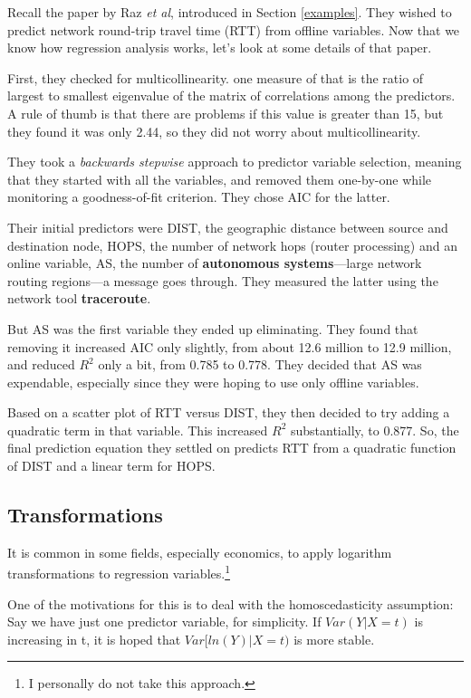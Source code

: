 Recall the paper by Raz {\it et al}, introduced in Section
\ref{examples}.  They wished to predict network round-trip travel time
(RTT) from offline variables.  Now that we know how regression analysis
works, let's look at some details of that paper.

First, they checked for multicollinearity.  one measure of that is the
ratio of largest to smallest eigenvalue of the matrix of correlations
among the predictors.  A rule of thumb is that there are problems if
this value is greater than 15, but they found it was only 2.44, so they
did not worry about multicollinearity.

They took a {\it backwards stepwise} approach to predictor variable
selection, meaning that they started with all the variables, and removed
them one-by-one while monitoring a goodness-of-fit criterion.  They
chose AIC for the latter.

Their initial predictors were DIST, the geographic distance between
source and destination node, HOPS, the number of network hops (router
processing) and an online variable, AS, the number of {\bf autonomous
systems}---large network routing regions---a message goes through.  They
measured the latter using the network tool {\bf traceroute}.

But AS was the first variable they ended up eliminating.  They found
that removing it increased AIC only slightly, from about 12.6 million to
12.9 million, and reduced $R^2$ only a bit, from 0.785 to 0.778.  They
decided that AS was expendable, especially since they were hoping to use
only offline variables.

Based on a scatter plot of RTT versus DIST, they then decided to try
adding a quadratic term in that variable.  This increased $R^2$
substantially, to 0.877.  So, the final prediction equation they settled
on predicts RTT from a quadratic function of DIST and a linear term for
HOPS.

\subsection{Transformations}

It is common in some fields, especially economics, to apply logarithm
transformations to regression variables.\footnote{I personally do not
take this approach.}

One of the motivations for this is to deal with the homoscedasticity
assumption:  Say we have just one predictor variable, for simplicity.
If $Var(Y | X = t)$ is increasing in t, it is hoped that $Var[ln(Y) | X
= t)$ is more stable.

